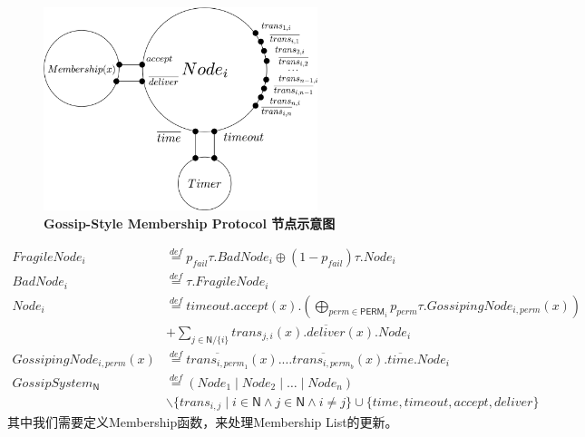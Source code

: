 \begin{figure}[!htbp]
	\small
	\centering
	\includegraphics[width=8cm]{../figure/Node_membership.png}
    \caption{\textbf{Gossip-Style Membership Protocol 节点示意图}}
    \label{fig_membership_node}
\end{figure}
\begin{align*}
    FragileNode_i&\stackrel{def}{=}p_{fail}\tau.BadNode_i\oplus (1-p_{fail})\tau.Node_i\\
    BadNode_i&\stackrel{def}{=}\tau.FragileNode_i\\
    Node_i&\stackrel{def}{=}timeout.accept(x).(\bigoplus_{perm\in \mathsf{PERM}_i} p_{perm}\tau.GossipingNode_{i,perm}(x))\\
     &+\sum_{j\in \mathsf{N}/\{i\}}trans_{j,i}(x).\overline{deliver}(x).Node_i\\
    GossipingNode_{i,perm}(x)&\stackrel{def}{=}\overline{trans_{i,perm_{1}}}(x).\dots \overline{trans_{i,perm_{b}}}(x).\overline{time}.Node_i\\
    GossipSystem_\mathsf{N}&\stackrel{def}{=}(Node_1\mid Node_2\mid \dots \mid Node_n)\\
    &\backslash \{trans_{i,j}\mid i\in \mathsf{N} \wedge j\in \mathsf{N} \wedge i\neq j\}\cup \{time, timeout, accept, deliver\}
 \end{align*}
 其中我们需要定义Membership函数，来处理Membership List的更新。

